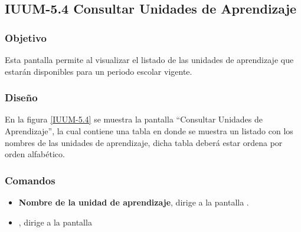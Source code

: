 \subsection{IUUM-5.4 Consultar Unidades de Aprendizaje}

\subsubsection{Objetivo}

	
    Esta pantalla permite al  visualizar el listado de las unidades de aprendizaje que estarán disponibles para un periodo escolar vigente.
\subsubsection{Diseño}


    En la figura \ref{IUUM-5.4} se muestra la pantalla ``Consultar Unidades de Aprendizaje'', la cual contiene una tabla en donde se muestra un listado con los nombres de las unidades de aprendizaje, dicha tabla deberá estar ordena por orden alfabético.



\subsubsection{Comandos}
    \begin{itemize}

	\item \textbf{Nombre de la unidad de aprendizaje}, dirige a la pantalla .
	\item {}, dirige a la pantalla 
    \end{itemize}
